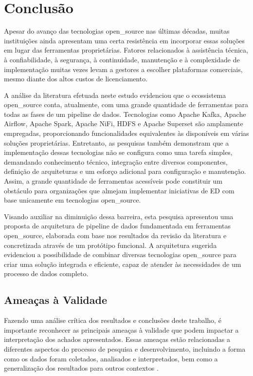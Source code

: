 \label{sec:conclusao}

\chapter{Conclusão}


Apesar do avanço das tecnologias \ac{open_source} nas últimas décadas, muitas instituições ainda apresentam uma certa resistência em incorporar essas soluções em lugar das ferramentas proprietárias. Fatores relacionados à assistência técnica, à confiabilidade, à segurança, à continuidade, manutenção e à complexidade de implementação muitas vezes levam a gestores a escolher plataformas comerciais, mesmo diante dos altos custos de licenciamento.

A análise da literatura efetuada neste estudo evidenciou que o ecossistema \ac{open_source} conta, atualmente, com uma grande quantidade de ferramentas para todas as fases de um pipeline de dados. Tecnologias como Apache Kafka, Apache Airflow, Apache Spark, Apache NiFi, HDFS e Apache Superset são amplamente empregadas, proporcionando funcionalidades equivalentes às disponíveis em várias soluções proprietárias. Entretanto, as pesquisas também demonstram que a implementação dessas tecnologias não se configura como uma tarefa simples, demandando conhecimento técnico, integração entre diversos componentes, definição de arquiteturas e um esforço adicional para configuração e manutenção. Assim, a grande quantidade de ferramentas acessíveis pode constituir um obstáculo para organizações que almejam implementar iniciativas de ED com base unicamente em tecnologias \ac{open_source}.

Visando auxiliar na diminuição dessa barreira, esta pesquisa apresentou uma proposta de arquitetura de pipeline de dados fundamentada em ferramentas \ac{open_source}, elaborada com base nos resultados da revisão da literatura e concretizada através de um protótipo funcional. A arquitetura sugerida evidenciou a possibilidade de combinar diversas tecnologias \ac{open_source} para criar uma solução integrada e eficiente, capaz de atender às necessidades de um processo de dados completo.


\section{Ameaças à Validade}

Fazendo uma análise crítica dos resultados e conclusões deste trabalho, é importante reconhecer as principais ameaças à validade que podem impactar a interpretação dos achados apresentados. Essas ameaças estão relacionadas a diferentes aspectos do processo de pesquisa e desenvolvimento, incluindo a forma como os dados foram coletados, analisados e interpretados, bem como a generalização dos resultados para outros contextos \cite[]{ihantola2011threats}.


